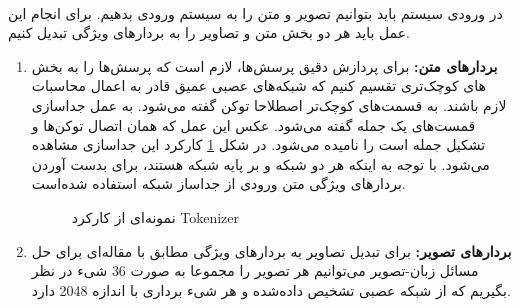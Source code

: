 \paragraph{}{
    در ورودی سیستم باید بتوانیم تصویر و متن را به سیستم ورودی بدهیم. برای 
    انجام این عمل باید هر دو بخش متن  و تصاویر را به بردار‌های ویژگی تبدیل کنیم. 
    
    \begin{enumerate}
        \item \textbf{بردارهای متن:}
                برای پردازش دقیق پرسش‌ها، لازم است که پرسش‌ها را به 
                بخش ‌های کوچک‌تری تقسیم کنیم که شبکه‌های عصبی عمیق قادر به اعمال محاسبات
                لازم باشند. به قسمت‌های کوچک‌تر اصطلاحا توکن گفته می‌شود. 
                به عمل جداسازی قمست‌های یک جمله 
                گفته می‌شود. عکس این عمل که همان اتصال توکن‌ها و تشکیل جمله است را
                نامیده می‌شود. در شکل 
                \ref{fig:tokenization}
                کارکرد این جداسازی مشاهده می‌شود. با توجه به اینکه هر دو شبکه
                و
                بر پایه شبکه 
                هستند، برای بدست آوردن بردارهای ویژگی متن ورودی از جداساز 
                شبکه 
                استفاده شده‌است. 
                \begin{figure}[H]
                    \caption{نمونه‌ای از کارکرد Tokenizer}
                    \label{fig:tokenization}
                \end{figure}
        \item  \textbf{بردارهای تصویر:}
                برای تبدیل تصاویر به بردارهای ویژگی مطابق با مقاله‌ای برای حل
                مسائل زبان-تصویر 
                \cite{anderson2018bottom}
                می‌توانیم هر تصویر را مجموعا به صورت 36 شیء در نظر بگیریم که از 
                شبکه عصبی
                 \cite{ren2015faster}
                تشخیص داده‌شده و هر شیء برداری با اندازه 2048 دارد.
                            
    \end{enumerate}
}


